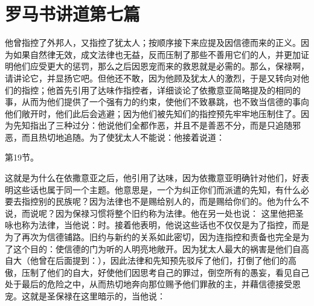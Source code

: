 

\section{罗马书讲道第七篇}

\par

\par

他曾指控了外邦人，又指控了犹太人；按顺序接下来应提及因信德而来的正义。因为如果自然律无效，成文法律也无益，反而压制了那些不善用它们的人，并更加证明他们应受更大的惩罚，那么之后因恩宠而来的救恩就是必需的。那么，保禄啊，请讲论它，并显扬它吧。但他还不敢，因为他顾及犹太人的激烈，于是又转向对他们的指控；他首先引用了达味作指控者，详细谈论了依撒意亚简略提及的相同的事，从而为他们提供了一个强有力的约束，使他们不致暴跳，也不致当信德的事向他们敞开时，他们此后会逃避；因为他们被先知们的指控预先牢牢地压制住了。因为先知指出了三种过分：他说他们全都作恶，并且不是善恶不分，而是只追随邪恶，而且热切地追随。为了使犹太人不能说：他接着说道：\par

第19节。\par

这就是为什么在依撒意亚之后，他引用了达味，因为依撒意亚明确针对他们，好表明这些话也属于同一个主题。他意思是，一个为纠正你们而派遣的先知，有什么必要去指控别的民族呢？因为法律也不是赐给别人的，而是赐给你们的。他为什么不说，而说呢？因为保禄习惯将整个旧约称为法律。他在另一处也说： 这里他把圣咏也称为法律，当他说：时。接着他表明，他说这些话也不仅仅是为了指控，而是为了再次为信德铺路。旧约与新约的关系如此密切，因为连指控和责备也完全是为了这个目的：使信德的门为听的人明亮地敞开。因为犹太人最大的祸害是他们自高自大（他曾在后面提到：），因此法律和先知预先驳斥了他们，打倒了他们的高傲，压制了他们的自大，好使他们因思考自己的罪过，倒空所有的愚妄，看见自己处于最后的危险之中，从而热切地奔向那位赐予他们罪赦的主，并藉信德接受恩宠。这就是圣保禄在这里暗示的，当他说：\par

